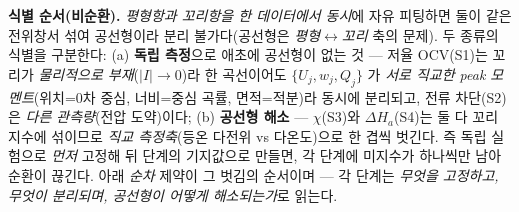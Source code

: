 \documentclass[11pt,a4paper]{article}
\begin{document}
\textbf{식별 순서(비순환).} \emph{평형항과 꼬리항을 한 데이터에서 동시}에 자유 피팅하면 둘이 같은 전위창서 섞여
공선형이라 분리 불가다(공선형은 \emph{평형$\leftrightarrow$꼬리} 축의 문제). 두 종류의 식별을 구분한다: (a) \textbf{독립
측정}으로 애초에 공선형이 없는 것 — 저율 OCV(S1)는 꼬리가 \emph{물리적으로 부재}($|I|\to0$)라 한 곡선이어도
$\{U_j,w_j,Q_j\}$ 가 \emph{서로 직교한 peak 모멘트}(위치=0차 중심, 너비=중심 곡률, 면적=적분)라 동시에 분리되고,
전류 차단(S2)은 \emph{다른 관측량}(전압 도약)이다; (b) \textbf{공선형 해소} — $\chi$(S3)와 $\Delta H_a$(S4)는 둘 다 꼬리
지수에 섞이므로 \emph{직교 측정축}(등온 다전위 vs 다온도)으로 한 겹씩 벗긴다. 즉 독립 실험으로 \emph{먼저}
고정해 뒤 단계의 기지값으로 만들면, 각 단계에 미지수가 하나씩만 남아 순환이 끊긴다. 아래 \emph{순차} 제약이 그
벗김의 순서이며 — 각 단계는 \emph{무엇을 고정하고, 무엇이 분리되며, 공선형이 어떻게 해소되는가}로 읽는다.
\end{document}
